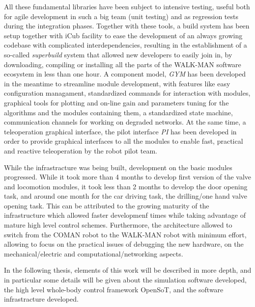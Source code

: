 \documentclass[%
	paper=A4,					%
	twoside=true,				%
	openright,			.
	parskip=full,				%
	chapterprefix=true,			%
	11pt,						%
	headings=normal,			%
	bibliography=totoc,			%
	listof=totoc,				%
	titlepage=on,				%
	captions=tableabove,		%
	draft=true,				%
]{scrreprt}%
\begin{document}
All these fundamental libraries have been subject to intensive testing, useful both for agile development in such a big team (unit testing) and as regression tests during the integration phases. Together with these tools, a build system has been setup together with iCub facility to ease the development of an always growing codebase with complicated interdependencies, resulting in the establishment of a so-called \emph{superbuild} system that allowed new developers to easily join in, by downloading, compiling or installing all the parts of the WALK-MAN software ecosystem in less than one hour. A component model, \emph{GYM} has been developed in the meantime to streamline module development, with features like easy configuration managament, standardized commands for interaction with modules, graphical tools for plotting and on-line gain and parameters tuning for the algorithms and the modules containing them, a standardized state machine, communication channels for working on degraded networks. At the same time, a teleoperation graphical interface, the pilot interface \emph{PI} has been developed in order to provide graphical interfaces to all the modules to enable fast, practical and reactive teleoperation by the robot pilot team.

While the infrastracture was being built, development on the basic modules progressed. While it took more than 4 months to develop first version of the valve and locomotion modules, it took less than 2 months to develop the door opening task, and around one month for the car driving task, the drilling/one hand valve opening task. This can be attributed to the growing maturity of the infrastructure which allowed faster developmenf times while taking advantage of mature high level control schemes. Furthermore, the architecture allowed to switch from the COMAN robot to the WALK-MAN robot with minimum effort, allowing to focus on the practical issues of debugging the new hardware, on the mechanical/electric and computational/networking aspects.

In the following thesis, elements of this work will be described in more depth, and in particular some details will be given about the simulation software developed, the high level whole-body control framework OpenSoT, and the software infrastracture developed.
\end{document}
